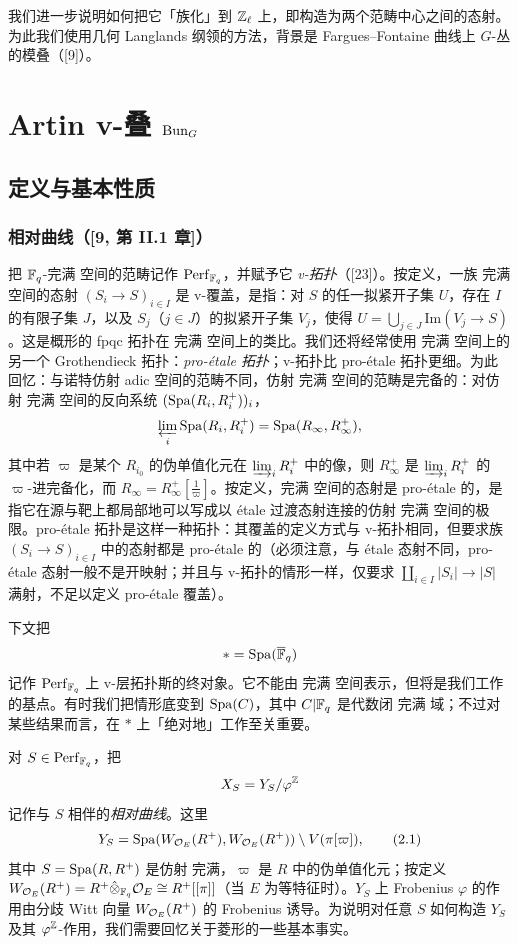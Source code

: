 我们进一步说明如何把它「族化」到 $\mathbb{Z}_\ell$ 上，即构造为两个范畴中心之间的态射。为此我们使用几何 Langlands 纲领的方法，背景是 Fargues–Fontaine 曲线上 $G$-丛的模叠（[9]）。

\section{Artin v-叠 $\operatorname{Bun}_G$}

\subsection{定义与基本性质}

\subsubsection{相对曲线（[9, 第 II.1 章]）}

把 $\mathbb{F}_q$-完满 空间的范畴记作 $\operatorname{Perf}_{\mathbb{F}_q}$，并赋予它 \emph{v-拓扑}（[23]）。按定义，一族 完满 空间的态射 $(S_i\to S)_{i\in I}$ 是 v-覆盖，是指：对 $S$ 的任一拟紧开子集 $U$，存在 $I$ 的有限子集 $J$，以及 $S_j$（$j\in J$）的拟紧开子集 $V_j$，使得 $U=\bigcup_{j\in J}\mathrm{Im}(V_j\to S)$。这是概形的 fpqc 拓扑在 完满 空间上的类比。我们还将经常使用 完满 空间上的另一个 Grothendieck 拓扑：\emph{pro-étale 拓扑}；v-拓扑比 pro-étale 拓扑更细。为此回忆：与诺特仿射 adic 空间的范畴不同，仿射 完满 空间的范畴是完备的：对仿射 完满 空间的反向系统 $(\operatorname{Spa}(R_i,R_i^+))_i$，
\[
\varprojlim_i\operatorname{Spa}(R_i,R_i^+)=\operatorname{Spa}(R_\infty,R_\infty^+),
\]
其中若 $\varpi$ 是某个 $R_{i_0}$ 的伪单值化元在 $\varinjlim_i R_i^+$ 中的像，则 $R_\infty^+$ 是 $\varinjlim_i R_i^+$ 的 $\varpi$-进完备化，而 $R_\infty=R_\infty^+[\frac{1}{\varpi}]$。按定义，完满 空间的态射是 pro-étale 的，是指它在源与靶上都局部地可以写成以 étale 过渡态射连接的仿射 完满 空间的极限。pro-étale 拓扑是这样一种拓扑：其覆盖的定义方式与 v-拓扑相同，但要求族 $(S_i\to S)_{i\in I}$ 中的态射都是 pro-étale 的（必须注意，与 étale 态射不同，pro-étale 态射一般不是开映射；并且与 v-拓扑的情形一样，仅要求 $\coprod_{i\in I}|S_i|\to|S|$ 满射，不足以定义 pro-étale 覆盖）。

下文把
\[
*=\operatorname{Spa}(\overline{\mathbb{F}}_q)
\]
记作 $\operatorname{Perf}_{\mathbb{F}_q}$ 上 v-层拓扑斯的终对象。它不能由 完满 空间表示，但将是我们工作的基点。有时我们把情形底变到 $\operatorname{Spa}(C)$，其中 $C|\mathbb{F}_q$ 是代数闭 完满 域；不过对某些结果而言，在 $*$ 上「绝对地」工作至关重要。

对 $S\in\operatorname{Perf}_{\mathbb{F}_q}$，把
\[
X_S=Y_S/\varphi^{\mathbb{Z}}
\]
记作与 $S$ 相伴的\emph{相对曲线}。这里
\begin{equation}
Y_S=\operatorname{Spa}(W_{\mathcal{O}_E}(R^+),W_{\mathcal{O}_E}(R^+))\setminus V(\pi[\varpi]), \tag{2.1}
\end{equation}
其中 $S=\operatorname{Spa}(R,R^+)$ 是仿射 完满，$\varpi$ 是 $R$ 中的伪单值化元；按定义 $W_{\mathcal{O}_E}(R^+)=R^+\hat\otimes_{\mathbb{F}_q}\mathcal{O}_E\cong R^+[[\pi]]$（当 $E$ 为等特征时）。$Y_S$ 上 Frobenius $\varphi$ 的作用由分歧 Witt 向量 $W_{\mathcal{O}_E}(R^+)$ 的 Frobenius 诱导。为说明对任意 $S$ 如何构造 $Y_S$ 及其 $\varphi^{\mathbb{Z}}$-作用，我们需要回忆关于菱形的一些基本事实。

